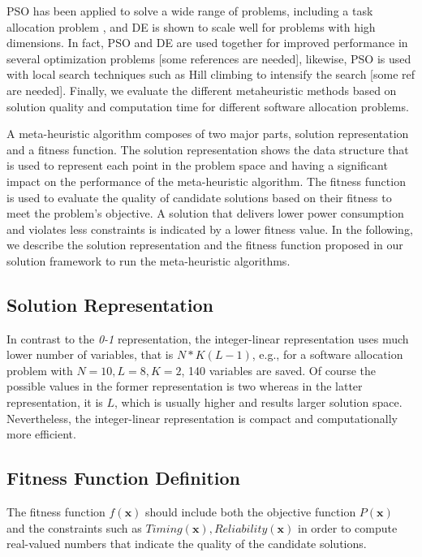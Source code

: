 PSO has been applied to solve a wide range of problems, including a task allocation problem \cite{yin2007task}, and DE is shown to scale well for problems with high dimensions. In fact, PSO and DE are used together for improved performance in several optimization problems [some references are needed], likewise, PSO is used with local search techniques such as Hill climbing to intensify the search [some ref are needed]. Finally, we evaluate the different metaheuristic methods based on solution quality and computation time for different software allocation problems.

A meta-heuristic algorithm composes of two major parts, solution representation and a fitness function. The solution representation shows the data structure that is used to represent each point in the problem space and having a significant impact on the performance of the meta-heuristic algorithm. The fitness function is used to evaluate the quality of candidate solutions based on their fitness to meet the problem's objective. A solution that delivers lower power consumption and violates less constraints is indicated by a lower fitness value. In the following, we describe the solution representation and the fitness function proposed in our solution framework to run the meta-heuristic algorithms. 

\subsection{Solution Representation}
In contrast to the \textit{0-1} representation, the integer-linear representation uses much lower number of variables, that is $N*K(L-1)$, e.g., for a software allocation problem with $N=10,L=8,K=2$, 140 variables are saved. Of course the possible values in the former representation is two whereas in the latter representation, it is $L$, which is usually higher and results larger solution space. Nevertheless, the integer-linear representation is compact and computationally more efficient.

\subsection{Fitness Function Definition}
 The fitness function $f(\textbf{x})$ should include both the objective function $P(\textbf{x})$ and the constraints such as $Timing(\textbf{x}),Reliability(\textbf{x})$ in order to compute real-valued numbers that indicate the quality of the candidate solutions. 
 
